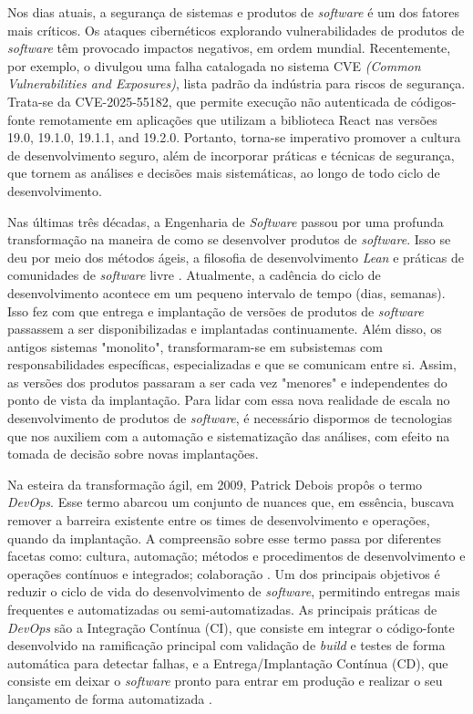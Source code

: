 Nos dias atuais, a segurança de sistemas e produtos de \textit{software} é um dos fatores mais críticos. Os ataques cibernéticos explorando vulnerabilidades de produtos de \textit{software} têm provocado impactos negativos, em ordem mundial. Recentemente, por exemplo, o  divulgou uma falha catalogada no sistema CVE \textit{(Common Vulnerabilities and Exposures)}, lista padrão da indústria para riscos de segurança. Trata-se da CVE-2025-55182, que permite execução não autenticada de códigos-fonte remotamente em aplicações que utilizam a biblioteca React nas versões 19.0, 19.1.0, 19.1.1, and 19.2.0. Portanto, torna-se imperativo promover a cultura de desenvolvimento seguro, além de incorporar práticas e técnicas de segurança, que tornem as análises e decisões mais sistemáticas, ao longo de todo ciclo de desenvolvimento.

Nas últimas três décadas, a Engenharia de \textit{Software} passou por uma profunda transformação na maneira de como se desenvolver produtos de \textit{software}. Isso se deu por meio dos métodos ágeis, a filosofia de desenvolvimento \textit{Lean} e práticas de comunidades de \textit{software} livre \cite{Fitzgerald2017} \cite{LOPEZ2022111187}. Atualmente, a cadência do ciclo de desenvolvimento acontece em um pequeno intervalo de tempo (dias, semanas). Isso fez com que entrega e implantação de versões de produtos de \textit{software} passassem a ser disponibilizadas e implantadas continuamente. Além disso, os antigos sistemas "monolito", transformaram-se em subsistemas com responsabilidades específicas, especializadas e que se comunicam entre si. Assim, as versões dos produtos passaram a ser cada vez "menores" e independentes do ponto de vista da implantação. Para lidar com essa nova realidade de escala no desenvolvimento de produtos de \textit{software}, é necessário dispormos de tecnologias que nos auxiliem com a automação e sistematização das análises, com efeito na tomada de decisão sobre novas implantações.

Na esteira da transformação ágil, em 2009, Patrick Debois propôs o termo \textit{DevOps}. Esse termo abarcou um conjunto de nuances que, em essência, buscava remover a barreira existente entre os times de desenvolvimento e operações, quando da implantação. A compreensão sobre esse termo passa por diferentes facetas como: cultura, automação; métodos e procedimentos de desenvolvimento e operações contínuos e integrados; colaboração \cite{10.1145} \cite{10.21203v1} \cite{DBLP:journals/jss/LuzPB19}. Um dos principais objetivos é reduzir o ciclo de vida do desenvolvimento de \textit{software}, permitindo entregas mais frequentes e automatizadas ou semi-automatizadas. As principais práticas de \textit{DevOps} são a Integração Contínua (CI), que consiste em integrar o código-fonte desenvolvido na ramificação principal com validação de \textit{build} e testes de forma automática para detectar falhas, e a Entrega/Implantação Contínua (CD), que consiste em deixar o \textit{software} pronto para entrar em produção e realizar o seu lançamento de forma automatizada \cite{Rajapakse2022}. 

